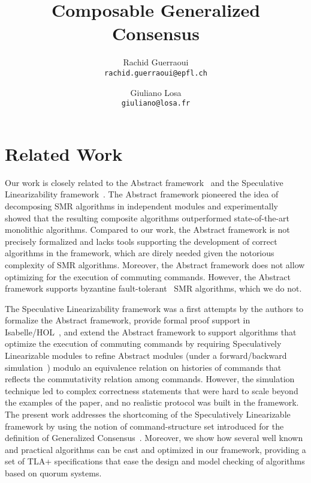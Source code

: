 \documentclass{llncs}
\title{Composable Generalized Consensus}
\author{
  Rachid Guerraoui\\
  \texttt{rachid.guerraoui@epfl.ch}
  \and
  Giuliano Losa\\
  \texttt{giuliano@losa.fr}
}
\date{}
\begin{document}
\maketitle




\newpage



%


\section{Related Work}
\label{sec:related}

Our work is closely related to the Abstract
framework~\cite{GuerraouiETAL10Next700BftProtocols}
and the Speculative Linearizability
framework~\cite{GuerraouiKuncakLosa12SpeculativeLinearizability}. The
Abstract framework pioneered the idea of decomposing SMR algorithms in
independent modules and experimentally showed that the resulting composite
algorithms outperformed state-of-the-art monolithic algorithms. Compared
to our work, the Abstract framework is not precisely formalized and lacks
tools supporting the development of correct algorithms in the framework,
which are direly needed given the notorious complexity of SMR algorithms.
Moreover, the Abstract framework does not allow optimizing for the execution
of commuting commands. However, the Abstract framework supports byzantine
fault-tolerant~\cite{LamportShostakPease82ByzantineGeneralsProblem} SMR
algorithms, which we do not. 

The Speculative Linearizability framework was a
first attempts by the authors to formalize the Abstract framework, provide
formal proof support in Isabelle/HOL~\cite{NipkowPaulsonWenzel02IsabelleHOL},
and extend the Abstract framework to support algorithms that optimize
the execution of commuting commands by requiring Speculatively
Linearizable modules to refine Abstract modules (under a forward/backward
simulation~\cite{LynchVaandrager95ForwardBackwardSimulationsIUntimedSystems})
modulo an equivalence relation on histories of commands that reflects the
commutativity relation among commands. However, the simulation technique led to
complex correctness statements that were hard to scale beyond the examples of
the paper, and no realistic protocol was built in the framework. The present
work addresses the shortcoming of the Speculatively Linearizable framework by
using the notion of command-structure set introduced for the definition of
Generalized Consensus~\cite{Lamport05GeneralizeConsensus}. Moreover, we show how
several well known and practical algorithms can be cast and optimized in our
framework, providing a set of TLA+ specifications that ease the design and model
checking of algorithms based on quorum systems.
\end{document}
